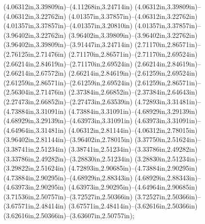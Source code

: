 (4.06312in,3.39809in)--(4.11268in,3.24714in) (4.06312in,3.39809in)--(4.06312in,3.22762in) (4.01357in,3.37857in)--(4.06312in,3.22762in) (4.01357in,3.37857in)--(4.01357in,3.20810in) (4.01357in,3.37857in)--(3.96402in,3.22762in) (3.96402in,3.39809in)--(3.96402in,3.22762in) (3.96402in,3.39809in)--(3.91447in,3.24714in) (2.71170in,2.86571in)--(2.76125in,2.71476in) (2.71170in,2.86571in)--(2.71170in,2.69524in) (2.66214in,2.84619in)--(2.71170in,2.69524in) (2.66214in,2.84619in)--(2.66214in,2.67572in) (2.66214in,2.84619in)--(2.61259in,2.69524in) (2.61259in,2.86571in)--(2.61259in,2.69524in) (2.61259in,2.86571in)--(2.56304in,2.71476in) (2.37384in,2.66852in)--(2.37384in,2.64643in) (2.27473in,2.66852in)--(2.27473in,2.63539in) (4.72893in,3.31481in)--(4.73884in,3.31091in) (4.73884in,3.31091in)--(4.68929in,3.29139in) (4.68929in,3.29139in)--(4.63973in,3.31091in) (4.63973in,3.31091in)--(4.64964in,3.31481in) (4.06312in,2.81144in)--(4.06312in,2.78015in) (3.96402in,2.81144in)--(3.96402in,2.78015in) (3.37750in,2.51624in)--(3.38741in,2.51234in) (3.38741in,2.51234in)--(3.33786in,2.49282in) (3.33786in,2.49282in)--(3.28830in,2.51234in) (3.28830in,2.51234in)--(3.29822in,2.51624in) (4.72893in,2.90685in)--(4.73884in,2.90295in) (4.73884in,2.90295in)--(4.68929in,2.88343in) (4.68929in,2.88343in)--(4.63973in,2.90295in) (4.63973in,2.90295in)--(4.64964in,2.90685in) (3.71536in,2.50757in)--(3.72527in,2.50366in) (3.72527in,2.50366in)--(3.67571in,2.48414in) (3.67571in,2.48414in)--(3.62616in,2.50366in) (3.62616in,2.50366in)--(3.63607in,2.50757in);
